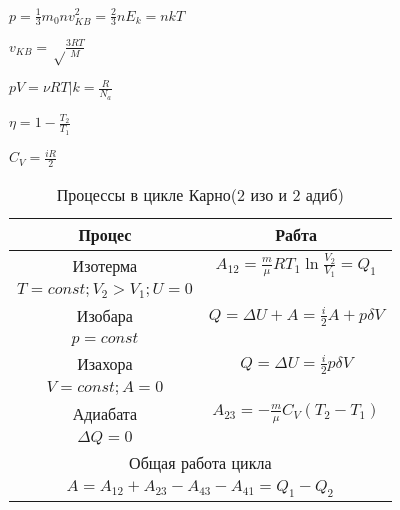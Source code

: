 \documentclass[8pt]{book}
\begin{document}
$p= \frac{1}{3}m_0nv_{KB}^{2} = \frac{2}{3}nE_k=nkT $ 

$v_{KB}= \sqrt \frac{3RT}{M} $ 

$ pV= \nu RT \vert k=\frac{R}{N_a}$

$ \eta = 1 - \frac{T_2}{T_1}  $

$ C_V = \frac{iR}{2} $

\begin{table}[H] 
\caption{\label{tab:summary}Процессы в цикле Карно(2 изо и 2 адиб)} 
\begin{center} 
\begin{tabular}{|c|c|} 
\hline 
Процес & Рабта \\ 
\hline 
Изотерма & $ A_{12}=\frac{m}{\mu}RT_1\ln{\frac{V_2}{V_1}}=Q_1$ \\ 
$ T=const; V_2>V_1; U=0 $ \\
\hline 
Изобара &  $ Q = \Delta{U} + A= \frac{i}{2}A+p\delta{V} $ \\
$ p = const $ \\
\hline 
Изахора &  $ Q = \Delta{U}= \frac{i}{2}p\delta{V} $ \\
$ V = const; A=0 $ \\
\hline
Адиабата &  $ A_{23} = -\frac{m}{\mu}C_V(T_2-T_1) $ \\
$ \Delta{Q}=0 $ \\
\hline  
\multicolumn{2}{|c|}{Общая работа цикла} \\ 
\hline 
\multicolumn{2}{|c|}{$A=A_{12}+A_{23}-A_{43}-A_{41}= Q_1-Q_2$ }\\ 
\hline 
\end{tabular} 
\end{center} 
\end{table}
\end{document}
